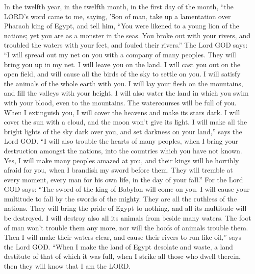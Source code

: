  In the twelfth year, in the twelfth month, in the first
day of the month, ``the LORD's word came to me, saying, 
'Son of man, take up a lamentation over Pharaoh king of Egypt, and tell
him, ``You were likened to a young lion of the nations; yet you are as a
monster in the seas. You broke out with your rivers, and troubled the
waters with your feet, and fouled their rivers.''  The
Lord GOD says: ``I will spread out my net on you with a company of many
peoples. They will bring you up in my net.  I will leave
you on the land. I will cast you out on the open field, and will cause
all the birds of the sky to settle on you. I will satisfy the animals of
the whole earth with you.  I will lay your flesh on the
mountains, and fill the valleys with your height.  I will
also water the land in which you swim with your blood, even to the
mountains. The watercourses will be full of you.  When I
extinguish you, I will cover the heavens and make its stars dark. I will
cover the sun with a cloud, and the moon won't give its light.
 I will make all the bright lights of the sky dark over
you, and set darkness on your land,'' says the Lord GOD. 
``I will also trouble the hearts of many peoples, when I bring your
destruction amongst the nations, into the countries which you have not
known.  Yes, I will make many peoples amazed at you, and
their kings will be horribly afraid for you, when I brandish my sword
before them. They will tremble at every moment, every man for his own
life, in the day of your fall.''  For the Lord GOD says:
``The sword of the king of Babylon will come on you.  I
will cause your multitude to fall by the swords of the mighty. They are
all the ruthless of the nations. They will bring the pride of Egypt to
nothing, and all its multitude will be destroyed.  I will
destroy also all its animals from beside many waters. The foot of man
won't trouble them any more, nor will the hoofs of animals trouble them.
 Then I will make their waters clear, and cause their
rivers to run like oil,'' says the Lord GOD.  ``When I
make the land of Egypt desolate and waste, a land destitute of that of
which it was full, when I strike all those who dwell therein, then they
will know that I am the LORD.

